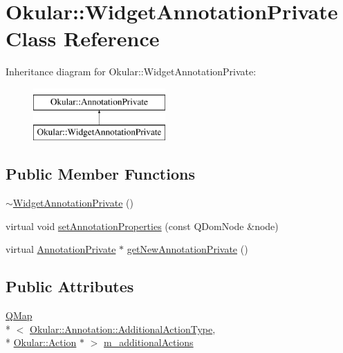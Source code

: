 \hypertarget{classOkular_1_1WidgetAnnotationPrivate}{\section{Okular\+:\+:Widget\+Annotation\+Private Class Reference}
\label{classOkular_1_1WidgetAnnotationPrivate}
}
Inheritance diagram for Okular\+:\+:Widget\+Annotation\+Private\+:\begin{figure}[H]
\begin{center}
\leavevmode
\includegraphics[height=2.000000cm]{classOkular_1_1WidgetAnnotationPrivate}
\end{center}
\end{figure}
\subsection*{Public Member Functions}
\begin{DoxyCompactItemize}
\item 
\hyperlink{classOkular_1_1WidgetAnnotationPrivate_a1faf14ddbaabbb735ae51ba689d0cbe2}{$\sim$\+Widget\+Annotation\+Private} ()
\item 
virtual void \hyperlink{classOkular_1_1WidgetAnnotationPrivate_a5f979bcec054e6b64875bce8607a57e0}{set\+Annotation\+Properties} (const Q\+Dom\+Node \&node)
\item 
virtual \hyperlink{classOkular_1_1AnnotationPrivate}{Annotation\+Private} $\ast$ \hyperlink{classOkular_1_1WidgetAnnotationPrivate_aa9f0463c4f51aaa455b50e1fd2f1e912}{get\+New\+Annotation\+Private} ()
\end{DoxyCompactItemize}
\subsection*{Public Attributes}
\begin{DoxyCompactItemize}
\item 
\hyperlink{classQMap}{Q\+Map}\\*
$<$ \hyperlink{classOkular_1_1Annotation_aa34152e337b1cb13e9327f37fc295057}{Okular\+::\+Annotation\+::\+Additional\+Action\+Type}, \\*
\hyperlink{classOkular_1_1Action}{Okular\+::\+Action} $\ast$ $>$ \hyperlink{classOkular_1_1WidgetAnnotationPrivate_ab2ee99f0d8e3f8196f8be7483ded3a2a}{m\+\_\+additional\+Actions}
\end{DoxyCompactItemize}


